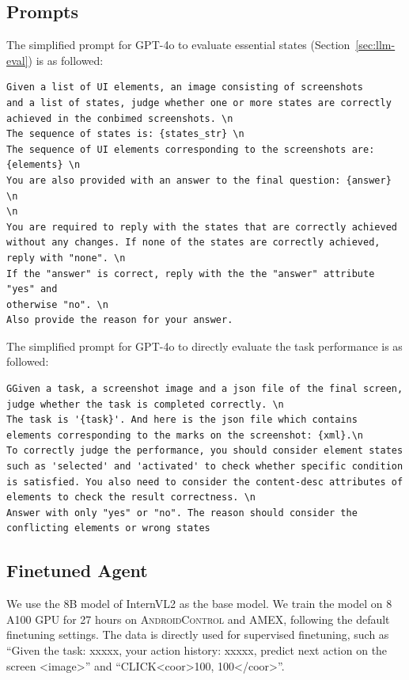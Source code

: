 \documentclass[11pt]{article}
\begin{document}
\subsection{Prompts}

The simplified prompt for GPT-4o to evaluate essential states (Section~\ref{sec:llm-eval}) is as followed:

\begin{lstlisting}[style=prompt, caption={Prompt for essential states evaluation.}]
Given a list of UI elements, an image consisting of screenshots
and a list of states, judge whether one or more states are correctly
achieved in the conbimed screenshots. \n
The sequence of states is: {states_str} \n
The sequence of UI elements corresponding to the screenshots are: {elements} \n
You are also provided with an answer to the final question: {answer} \n
\n
You are required to reply with the states that are correctly achieved
without any changes. If none of the states are correctly achieved, 
reply with "none". \n
If the "answer" is correct, reply with the the "answer" attribute "yes" and 
otherwise "no". \n
Also provide the reason for your answer.
\end{lstlisting}


The simplified prompt for GPT-4o to directly evaluate the task performance is as followed:

\begin{lstlisting}[style=prompt, caption={Prompt for final state evaluation.}]
GGiven a task, a screenshot image and a json file of the final screen, judge whether the task is completed correctly. \n
The task is '{task}'. And here is the json file which contains elements corresponding to the marks on the screenshot: {xml}.\n
To correctly judge the performance, you should consider element states such as 'selected' and 'activated' to check whether specific condition is satisfied. You also need to consider the content-desc attributes of elements to check the result correctness. \n
Answer with only "yes" or "no". The reason should consider the conflicting elements or wrong states
\end{lstlisting}

\subsection{Finetuned Agent}
\label{app:finetune}

We use the 8B model of InternVL2 as the base model. We train the model on 8 A100 GPU for 27 hours on \textsc{AndroidControl} and AMEX, following the default finetuning settings. 
The data is directly used for supervised finetuning, such as ``Given the task: xxxxx, your action history: xxxxx, predict next action on the screen <image>'' and ``CLICK<coor>100, 100</coor>''.
\end{document}
